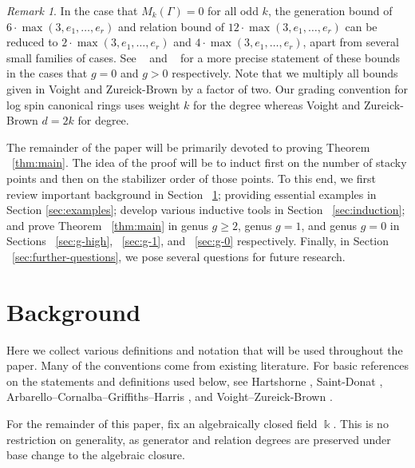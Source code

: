 \documentclass{amsart}
\theoremstyle{plain}
\theoremstyle{definition}
\theoremstyle{remark}
\newtheorem{rem}[thm]{Remark}
\numberwithin{equation}{section}
\newcommand\Bk{{\Bbbk}}
\begin{document}
\begin{rem}
\label{rem:factor-two}
In the case that $M_k(\Gamma) = 0$ for all odd $k$, the generation bound of $6 \cdot \max(3, e_1, \ldots, e_r)$ and relation
bound of $12 \cdot \max(3, e_1, \ldots, e_r)$ can be reduced to $2\cdot \max(3,e_1, \ldots, e_r)$ and $4 \cdot \max(3,e_1, \ldots, e_r)$, apart from several small families of cases. See 
~\cite[Theorem 9.3.1]{vzb:stacky} and ~\cite[Theorem 8.7.1]{vzb:stacky} for a more precise statement of these bounds in the cases that $g = 0$ and $g > 0$ respectively. Note that we multiply all bounds given in Voight and Zureick-Brown \cite{vzb:stacky} by a factor of two. Our grading convention for log spin canonical rings uses weight $k$ for the degree whereas Voight and Zureick-Brown $d = 2k$ for degree.
\end{rem}


The remainder of the paper will be primarily devoted to proving
Theorem ~\ref{thm:main}. The idea of the
proof will be to induct first on the number of stacky points and then on the stabilizer order of those points.  To this end, we first review important background in
Section ~\ref{sec:background}; providing essential examples in Section \ref{sec:examples}; develop various inductive
tools in Section ~\ref{sec:induction}; and prove Theorem ~\ref{thm:main} in genus $g\ge 2$, genus $g=1$, and genus $g=0$ in Sections ~\ref{sec:g-high},
~\ref{sec:g-1}, and ~\ref{sec:g-0} respectively.  
Finally, in Section
~\ref{sec:further-questions}, we pose several questions for future
research.


\section{Background}
\label{sec:background}
Here we collect various definitions and notation that will be
used throughout the paper. Many of the conventions come from existing
literature. For basic references on the statements and definitions
used below, see Hartshorne \cite[Chapter IV]{hartshorne:ag},
Saint-Donat \cite{saint-donat:proj}, Arbarello--Cornalba--Griffiths--Harris 
\cite[Section III.2]
{acgh:algebraic-curves}, and Voight--Zureick-Brown \cite[Chapter 2,
Chapter 5]{vzb:stacky}.

For the remainder of this paper, fix an algebraically closed field $\Bk$.
This is no restriction on generality, as generator and relation degrees are preserved under base change to the algebraic closure.
\end{document}
